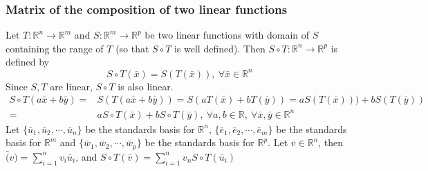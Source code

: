 \subsubsection{Matrix of the composition of two linear functions}
Let $T : \mathbb{R}^n \to \mathbb{R}^m$ and $S : \mathbb{R}^m \to \mathbb{R}^p$ be two linear functions with domain of $S$ containing the range of $T$ (so that $S \circ T$ is well defined).
Then $S \circ T : \mathbb{R}^n \to \mathbb{R}^p$ is defined by
\[ S \circ T(\bar{x}) = S(T(\bar{x})),\ \forall \bar{x} \in \mathbb{R}^n\]
Since $S,T$ are linear, $S \circ T$ is also linear.
\begin{align*}
	S \circ T(a \bar{x} + b \bar{y}) = & S(T(a \bar{x} + b\bar{y})) = S(a T(\bar{x}) + b T(\bar{y})) = a S(T(\bar{x}))) + b S(T(\bar{y})) \\
	= & a S \circ T(\bar{x}) + b S \circ T(\bar{y}),\ \forall a,b \in \mathbb{R},\ \forall \bar{x},\bar{y} \in \mathbb{R}^n
\end{align*}
Let $\{\bar{u}_1,\bar{u}_2,\cdots,\bar{u}_n\}$ be the standards basis for $\mathbb{R}^n$, $\{\bar{e}_1,\bar{e}_2,\cdots,\bar{e}_m\}$ be the standards basis for $\mathbb{R}^m$ and $\{\bar{w}_1,\bar{w}_2,\cdots,\bar{w}_p\}$ be the standards basis for $\mathbb{R}^p$.
Let $\bar{v} \in \mathbb{R}^n$, then $\bar(v) = \sum_{i=1}^n v_i\bar{u}_i$, and $S \circ T(\bar{v})=\sum_{i=1}^n v_n S \circ T(\bar{u}_i)$
